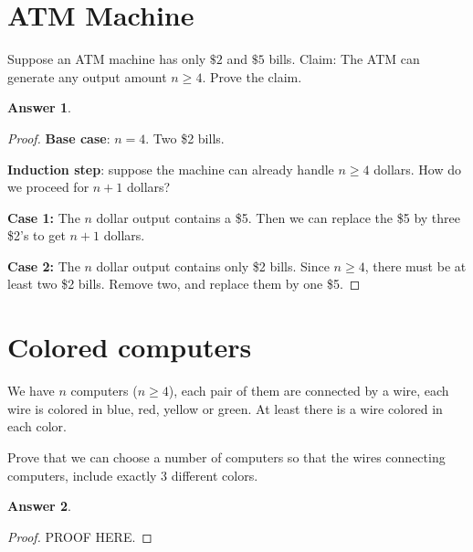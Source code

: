\documentclass[a4paper]{article}
\renewcommand{\(}{\left(}
\renewcommand{\)}{\right)}
\theoremstyle{plain}
\theoremstyle{plain}
\theoremstyle{definition}
\newtheorem*{answer}{Answer}
\begin{document}
\section{ATM Machine}
Suppose an ATM machine has only $\$2$ and $\$5$ bills.
Claim: The ATM can generate any output amount $n \geq 4$.
Prove the claim.
\begin{shaded}
\begin{answer}
\begin{proof}
\textbf{Base case}: $n = 4$. Two \$2 bills.

\textbf{Induction step}: suppose the machine can already handle $n \geq 4$ dollars.
How do we proceed for $n+1$ dollars?

\textbf{Case 1: }  The $n$ dollar output contains a \$5. Then we can replace the \$5 by three \$2's to get $ n+1$ dollars.
 
 \textbf{Case 2: } The $n$ dollar output contains only \$2 bills. Since $n \geq 4$, there must be at least two \$2 bills. Remove two, and replace them by one \$5.

\end{proof}
\end{answer}
\end{shaded}

\section{Colored computers}
We have $n$ computers ($n \geq 4$), each pair of them are connected by a wire, each wire is colored in blue, red, yellow or green. At least there is a wire colored in each color.

Prove that we can choose a number of computers so that the wires connecting computers, include exactly 3 different colors.

\begin{shaded}
\begin{answer}
\begin{proof}
PROOF HERE.
\end{proof}
\end{answer}
\end{shaded}
\end{document}
